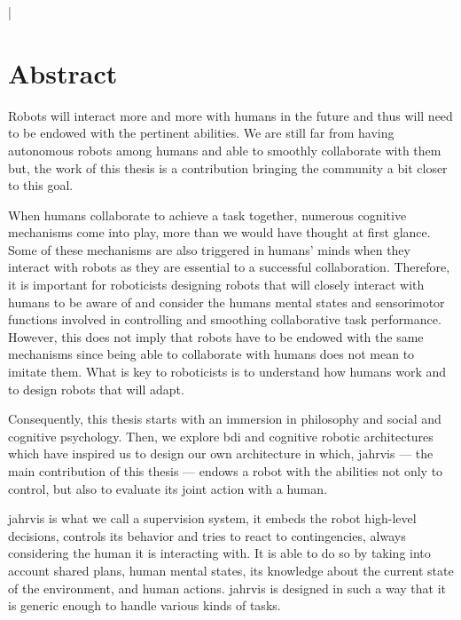 \documentclass[english,a4paper,11pt,twoside]{StyleThese}
\begin{document}
\lstMakeShortInline[columns=fixed,breaklines=false]|
\makeflyleaf

\cleardoublepage

\dominitoc


 \cleardoublepage


\chapter*{Abstract}

Robots will interact more and more with humans in the future and thus will need to be endowed with the pertinent abilities. We are still far from having autonomous robots among humans and able to smoothly collaborate with them but, the work of this thesis is a contribution bringing the community a bit closer to this goal. 

When humans collaborate to achieve a task together, numerous cognitive mechanisms come into play, more than we would have thought at first glance. Some of these mechanisms are also triggered in humans’ minds when they interact with robots as they are essential to a successful collaboration. Therefore, it is important for roboticists designing robots that will closely interact with humans to be aware of and consider the humans mental states and sensorimotor functions involved in controlling and smoothing collaborative task performance. However, this does not imply that robots have to be endowed with the same mechanisms since being able to collaborate with humans does not mean to imitate them. What is key to roboticists is to understand how humans work and to design  robots that will adapt. 

Consequently, this thesis starts with an immersion in philosophy and social and cognitive psychology. Then, we explore \acrfull{bdi} and cognitive robotic architectures  which have inspired us to design our own architecture in which, \acrshort{jahrvis} —  the main contribution of this thesis — endows a robot with the abilities not only to control, but also to evaluate its joint action with a human. 

\acrfull{jahrvis} is what we call a supervision system, \ie it embeds the robot high-level decisions, controls its behavior and tries to react to contingencies, always considering the human it is interacting with. It is able to do so by taking into account shared plans, human mental states, its knowledge about the current state of the environment, and human actions. \acrshort{jahrvis} is designed in such a way that it is generic enough to handle various kinds of tasks. 
\end{document}
